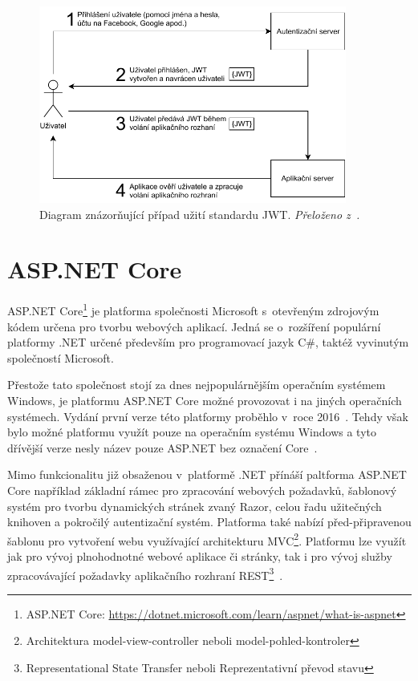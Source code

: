 \begin{figure}[H]
    \label{img:jwt}
	\centering
	\includegraphics[width=0.9\textwidth]{obrazky-figures/jwt.pdf}
	\caption{Diagram znázorňující případ užití standardu JWT. \emph{Přeloženo z~\cite{bib:jwt-steps}.}}
\end{figure}

\section{ASP.NET Core}
ASP.NET Core\footnote{ASP.NET Core: \url{https://dotnet.microsoft.com/learn/aspnet/what-is-aspnet}} je platforma společnosti Microsoft s~otevřeným zdrojovým kódem určena pro tvorbu webových aplikací. Jedná se o~rozšíření populární platformy .NET určené především pro programovací jazyk C\#, taktéž vyvinutým společností Microsoft.

Přestože tato společnost stojí za dnes nejpopulárnějším operačním systémem Windows, je platformu ASP.NET Core možné provozovat i na jiných operačních systémech. Vydání první verze této platformy proběhlo v~roce 2016~\cite{bib:asp-release}. Tehdy však bylo možné platformu využít pouze na operačním systému Windows a tyto dřívější verze nesly název pouze ASP.NET bez označení Core~\cite{bib:asp-what-is}.

Mimo funkcionalitu již obsaženou v~platformě .NET přínáší paltforma ASP.NET Core například základní rámec pro zpracování webových požadavků, šablonový systém pro tvorbu dynamických stránek zvaný Razor, celou řadu užitečných knihoven a pokročilý autentizační systém. Platforma také nabízí před-připravenou šablonu pro vytvoření webu využívající architekturu MVC\footnote{Architektura model-view-controller neboli model-pohled-kontroler}. Platformu lze využít jak pro vývoj plnohodnotné webové aplikace či stránky, tak i pro vývoj služby zpracovávající požadavky aplikačního rozhraní REST\footnote{Representational State Transfer neboli Reprezentativní převod stavu}~\cite{bib:asp-learn}.


